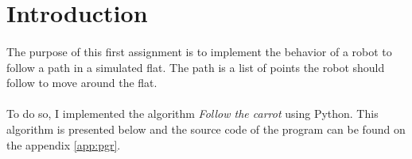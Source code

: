 \section*{Introduction}

\paragraph{}{
    The purpose of this first assignment is to implement the behavior
of a robot to follow a path in a simulated flat. The path is a list of points
the robot should follow to move around the flat.
}

\paragraph{}{
    To do so, I implemented the algorithm \textit{Follow the carrot} using
 Python. This algorithm is presented below and the source code of the program 
 can be found on the appendix \ref{app:pgr}.
}
